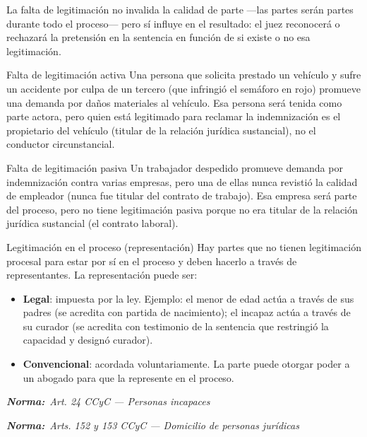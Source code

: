 \documentclass[12pt,oneside]{book}
\newcommand{\normaref}[1]{%
    \par\noindent\textbf{\textit{Norma:}}~\textit{#1}\par\vspace{0.2em}
}
\begin{document}
\begin{important}
La falta de legitimación no invalida la calidad de parte —las partes serán partes durante todo el proceso— pero sí influye en el resultado: el juez reconocerá o rechazará la pretensión en la sentencia en función de si existe o no esa legitimación.
\end{important}

\begin{example}{Falta de legitimación activa}
Una persona que solicita prestado un vehículo y sufre un accidente por culpa de un tercero (que infringió el semáforo en rojo) promueve una demanda por daños materiales al vehículo. Esa persona será tenida como parte actora, pero quien está legitimado para reclamar la indemnización es el propietario del vehículo (titular de la relación jurídica sustancial), no el conductor circunstancial.
\end{example}

\begin{example}{Falta de legitimación pasiva}
Un trabajador despedido promueve demanda por indemnización contra varias empresas, pero una de ellas nunca revistió la calidad de empleador (nunca fue titular del contrato de trabajo). Esa empresa será parte del proceso, pero no tiene legitimación pasiva porque no era titular de la relación jurídica sustancial (el contrato laboral).
\end{example}

\begin{definition}{Legitimación en el proceso (representación)}
Hay partes que no tienen legitimación procesal para estar por sí en el proceso y deben hacerlo a través de representantes. La representación puede ser:
\begin{itemize}
    \item \textbf{Legal}: impuesta por la ley. Ejemplo: el menor de edad actúa a través de sus padres (se acredita con partida de nacimiento); el incapaz actúa a través de su curador (se acredita con testimonio de la sentencia que restringió la capacidad y designó curador).
    \item \textbf{Convencional}: acordada voluntariamente. La parte puede otorgar poder a un abogado para que la represente en el proceso.
\end{itemize}
\end{definition}

\normaref{Art. 24 CCyC --- Personas incapaces}
\normaref{Arts. 152 y 153 CCyC --- Domicilio de personas jurídicas}
\end{document}
